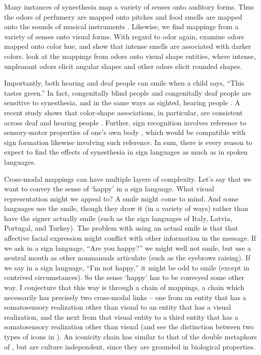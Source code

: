 \documentclass[output=paper,
modfonts
]{LSP/langsci}
\begin{document}
Many instances of synesthesia map a variety of senses onto auditory
forms. Thus the odors of perfumery are mapped onto pitches \citep{belkin1997} and food smells are mapped onto the sounds of musical
instruments \citep{crisinel2012}. Likewise, we find mappings from
a variety of senses onto visual forms. With regard to odor again,
\citet{dematte2006} examine odors mapped onto color hue, and \citet{kemp1997} show that intense smells are associated with darker
colors. \citet{hanson2013} look at the mappings
from odors onto visual shape entities, where intense, unpleasant odors
elicit angular shapes and other odors elicit rounded shapes.

Importantly, both hearing and deaf people can smile when a child says,
``This tastes green.'' In fact, congenitally blind people and
congenitally deaf people are sensitive to synesthesia, and in the same
ways as sighted, hearing people \citep{ittyerah1988}. A recent
study shows that color-shape associations, in particular, are consistent
across deaf and hearing people \citep{chen2014}. Further, sign
recognition involves reference to sensory-motor properties of one's own
body \citep{corina2016}, which would be compatible with sign
formation likewise involving such reference. In sum, there is every
reason to expect to find the effects of synesthesia in sign languages as
much as in spoken languages.

Cross-modal mappings can have multiple layers of complexity. Let's say
that we want to convey the sense of `happy' in a sign language. What
visual representation might we appeal to? A smile might come to mind.
And some languages use the smile, though they draw it (in a variety of
ways) rather than have the signer actually smile (such as the sign
languages of Italy, Latvia, Portugal, and Turkey). The problem with
using an actual smile is that that affective facial expression might
conflict with other information in the message. If we ask in a sign
language, ``Are you happy?'' we might well not smile, but use a neutral
mouth as other nonmanuals articulate (such as the eyebrows raising).
If we say in a sign language, ``I'm not happy,'' it might be odd to
smile (except in contrived circumstances). So the sense `happy' has to
be conveyed some other way. I conjecture that this way is through a
chain of mappings, a chain which necessarily has precisely two
cross-modal links -- one from an entity that has a somatosensory
realization other than visual to an entity that has a visual
realization, and the next from that visual entity to a third entity that
has a somatosensory realization other than visual (and see the
distinction between two types of icons in \citealt{pierce1932}). An iconicity
chain has  similar to that of the double metaphors of \citet{meir2010}, but  are culture independent, since they are
grounded in biological properties.
\end{document}
